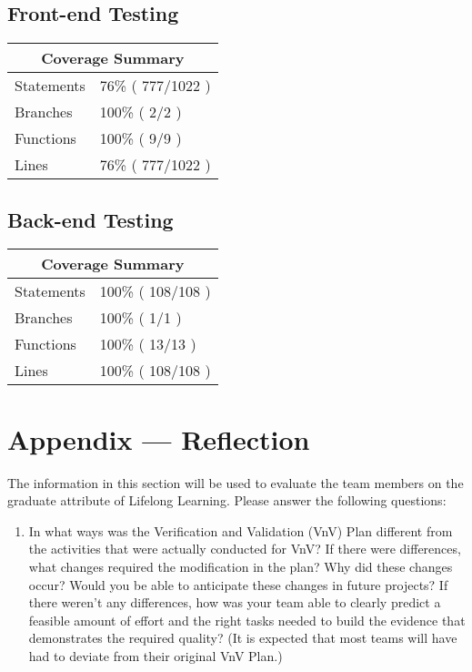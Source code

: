 \documentclass[12pt, titlepage]{article}
\begin{document}
\subsection{Front-end Testing}

\begin{tabular}{ |p{6cm}|p{6cm}|  }
 \hline
 \multicolumn{2}{|c|}{Coverage Summary} \\
 \hline
Statements   & 76\% ( 777/1022 )   \\ \hline
Branches   & 100\% ( 2/2 )  \\ \hline
Functions  & 100\%  ( 9/9 )  \\ \hline
Lines   & 76\% ( 777/1022 ) \\ \hline
\end{tabular}

\subsection{Back-end Testing}

\begin{tabular}{ |p{6cm}|p{6cm}|  }
 \hline
 \multicolumn{2}{|c|}{Coverage Summary} \\
 \hline
Statements   & 100\% ( 108/108 )   \\ \hline
Branches   & 100\% ( 1/1 )  \\ \hline
Functions  & 100\%  ( 13/13 )  \\ \hline
Lines   & 100\% ( 108/108 ) \\ \hline
\end{tabular}




\newpage{}
\section*{Appendix --- Reflection}

The information in this section will be used to evaluate the team members on the
graduate attribute of Lifelong Learning.  Please answer the following questions:

\begin{enumerate}
  \item In what ways was the Verification and Validation (VnV) Plan different from the activities that were actually conducted for VnV? If there were differences, what changes required the modification in the plan? Why did these changes occur? Would you be able to anticipate these changes in future projects? If there weren't any differences, how was your team able to clearly predict a feasible amount of effort and the right tasks needed to build the evidence that demonstrates the required quality? (It is expected that most teams will have had to deviate from their original VnV Plan.)  
\end{enumerate}
\end{document}
